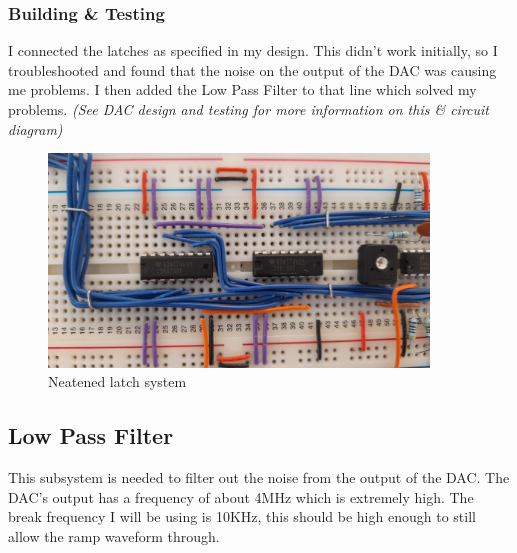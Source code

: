 \subsubsection{Building \& Testing}
I connected the latches as specified in my design. This didn’t work initially, so I troubleshooted and found that the noise on the output of the DAC was causing me problems. I then added the Low Pass Filter to that line which solved my problems. \textit{(See DAC design and testing for more information on this \& circuit diagram)}
\begin{figure} [H]
    \centering
    \begin{minipage}[t]{0.45\textwidth}
        \centering
        \includegraphics[width=0.9\textwidth]{images/latchNeatened.jpg}
        \caption{Neatened latch system}
        \label{fig:latchNeatened}
    \end{minipage}\hfill
    \begin{minipage}[t]{0.45\textwidth}
        \centering
    \end{minipage}
\end{figure}

\subsection{Low Pass Filter}
\label{sec:LPF}
This subsystem is needed to filter out the noise from the output of the DAC. The DAC's output has a frequency of about 4MHz which is extremely high. The break frequency I will be using is 10KHz, this should be high enough to still allow the ramp waveform through.

